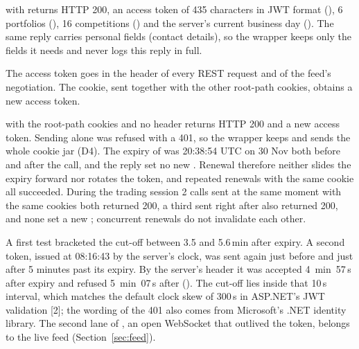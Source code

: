 \seclabel
{}

  with  returns HTTP 200, an access token of 435 characters in JWT format (), 6 portfolios (), 16 competitions () and the server's current business day (). The same reply carries personal fields (contact details), so the wrapper keeps only the fields it needs and never logs this reply in full.

 The access token goes in the  header of every REST request and of the feed's negotiation. The  cookie, sent together with the other root-path cookies, obtains a new access token.



  with the root-path cookies and no  header returns HTTP 200 and a new access token. Sending  alone was refused with a 401, so the wrapper keeps and sends the whole cookie jar (D4). The expiry of  was 20:38:54 UTC on 30 Nov both before and after the call, and the reply set no new . Renewal therefore neither slides the expiry forward nor rotates the token, and repeated renewals with the same cookie all succeeded. During the trading session 2  calls sent at the same moment with the same cookies both returned 200, a third sent right after also returned 200, and none set a new ; concurrent renewals do not invalidate each other.

 A first test bracketed the cut-off between 3.5 and 5.6\,min after expiry. A second token, issued at 08:16:43 by the server's clock, was sent again just before and just after 5 minutes past its expiry. By the server's  header it was accepted 4~min~57\,s after expiry and refused 5~min~07\,s after (). The cut-off lies inside that 10\,s interval, which matches the default clock skew of 300\,s in ASP.NET's JWT validation [2]; the wording of the 401 also comes from Microsoft's .NET identity library. The second lane of , an open WebSocket that outlived the token, belongs to the live feed (Section~\ref{sec:feed}).


